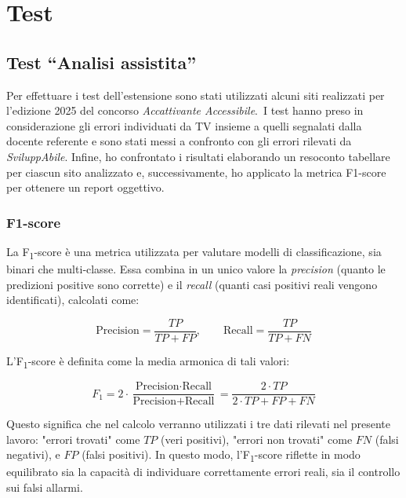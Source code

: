 
\hypersetup{
  colorlinks=true,
  linkcolor=blue,   %
  citecolor=blue,   %
  urlcolor=darkblue  %
}

\DeclareRobustCommand{\wcagref}[2][]{%
  \hyperref[#1]{\textcolor{emerald}{#2}}%
}

\chapter{Test}
\label{chap:test}

\section{Test ``Analisi assistita''}
\noindent Per effettuare i test dell’estensione sono stati utilizzati alcuni siti realizzati per l'edizione 2025 del concorso \textit{Accattivante Accessibile}.\
I test hanno preso in considerazione gli errori individuati da TV insieme a quelli segnalati dalla docente referente e sono stati messi a confronto con gli errori rilevati da \textit{SviluppAbile}.
Infine, ho confrontato i risultati elaborando un resoconto tabellare per ciascun sito analizzato e, successivamente, ho applicato la metrica F1-score per ottenere un report oggettivo.

\subsection{F1-score}
\noindent La F\textsubscript{1}-score è una metrica utilizzata per valutare modelli di classificazione, sia binari che multi‐classe. Essa combina in un unico valore la \textit{precision} (quanto le predizioni positive sono corrette) e il \textit{recall} (quanti casi positivi reali vengono identificati), calcolati come:

\[
\text{Precision} = \frac{TP}{TP + FP}, 
\qquad
\text{Recall} = \frac{TP}{TP + FN}
\]

\vspace{0.5cm}
\noindent L’F\textsubscript{1}-score è definita come la media armonica di tali valori:

\[
F_{1} = 2 \cdot \frac{\text{Precision} \cdot \text{Recall}}{\text{Precision} + \text{Recall}}
 = \frac{2 \cdot TP}{2 \cdot TP + FP + FN}
\]
\vspace{0.1cm}

\noindent Questo significa che nel calcolo verranno utilizzati i tre dati rilevati nel presente lavoro:
"errori trovati" come \(TP\) (veri positivi), "errori non trovati" come \(FN\) (falsi negativi), e \(FP\) (falsi positivi).
In questo modo, l’F\textsubscript{1}-score riflette in modo equilibrato sia la capacità di individuare correttamente errori reali, sia il controllo sui falsi allarmi.\\

